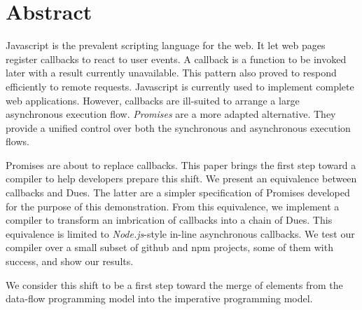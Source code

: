 \section*{Abstract}

Javascript is the prevalent scripting language for the web.
It let web pages register callbacks to react to user events.
A callback is a function to be invoked later with a result currently unavailable.
This pattern also proved to respond efficiently to remote requests.
Javascript is currently used to implement complete web applications.
However, callbacks are ill-suited to arrange a large asynchronous execution flow.
\textit{Promises} are a more adapted alternative.
They provide a unified control over both the synchronous and asynchronous execution flows.

Promises are about to replace callbacks.
This paper brings the first step toward a compiler to help developers prepare this shift.
We present an equivalence between callbacks and Dues.
The latter are a simpler specification of Promises developed for the purpose of this demonstration.
From this equivalence, we implement a compiler to transform an imbrication of callbacks into a chain of Dues.
This equivalence is limited to \textit{Node.js}-style in-line asynchronous callbacks.
We test our compiler over a small subset of github and npm projects, some of them with success, and show our results.

We consider this shift to be a first step toward the merge of elements from the data-flow programming model into the imperative programming model.


